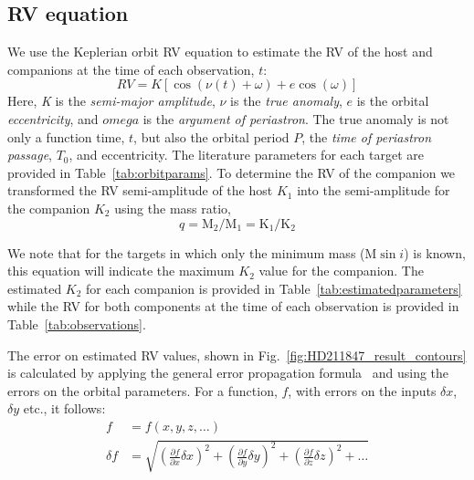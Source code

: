 \documentclass[fleqn,usenatbib]{mnras}
\begin{document}
    \subsection{RV equation}
    We use the Keplerian orbit RV equation to estimate the RV of the host and companions at the time of each observation, \(t\):
    \begin{equation}
    \label{eq:rv_equation}
    RV = K [\cos{(\nu(t) + \omega)} + e\cos{(\omega)}]
    \end{equation}
    Here, \emph{K} is the \emph{semi-major amplitude}, \(\nu\) is the \emph{true anomaly}, \(e\) is the orbital \emph{eccentricity}, and \(omega\) is the \emph{argument of periastron}. The true anomaly is not only a function time, \(t\), but also the orbital period \(P\),  the \emph{time of periastron passage}, \(T_0\), and eccentricity. The literature parameters for each target are provided in Table~\ref{tab:orbitparams}.
    To determine the RV of the companion we transformed the RV semi-amplitude of the host \(K_{1}\) into the semi-amplitude for the companion \(K_{2}\) using the mass ratio,
    \begin{equation}
    \label{eqn:mass_ratio}
    q = \textrm{M}_{2} / \textrm{M}_{1} = \textrm{K}_{1} / \textrm{K}_{2}
    \end{equation}

    We note that for the targets in which only the minimum mass (\(\textrm{M}\sin{i}\)) is known, this equation will indicate the maximum \(K_2\) value for the companion. The estimated \(K_2\) for each companion is provided in Table~\ref{tab:estimatedparameters} while the RV for both components at the time of each observation is provided in Table~\ref{tab:observations}.

    The error on estimated RV values, shown in Fig.~\ref{fig:HD211847_result_contours} is calculated by applying the general error propagation formula~\citep{ku_notes_1966} and using the errors on the orbital parameters. For a function, \(f\), with errors on the inputs \(\delta x\), \(\delta y\) etc., it follows:
    \begin{align}
    f &= f(x, y, z, \ldots)\\
    \delta f &= \sqrt{{\left( \frac{\partial f}{\partial x} \delta x\right)}^2 + {\left(\frac{\partial f}{\partial y} \delta y\right)}^2 + {\left(\frac{\partial f}{\partial z} \delta z\right)}^2 + \ldots}
    \end{align}
\end{document}
